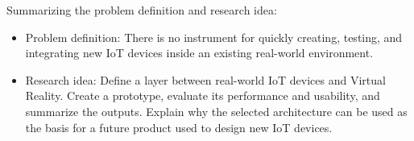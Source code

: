 Summarizing the problem definition and research idea:

\begin{itemize}
    \item Problem definition: There is no instrument for quickly creating, testing, and integrating new IoT devices inside an existing real-world environment.  
    \item Research idea: Define a layer between real-world IoT devices and Virtual Reality. Create a prototype, evaluate its performance and usability, and summarize the outputs. Explain why the selected architecture can be used as the basis for a future product used to design new IoT devices.
\end{itemize}
